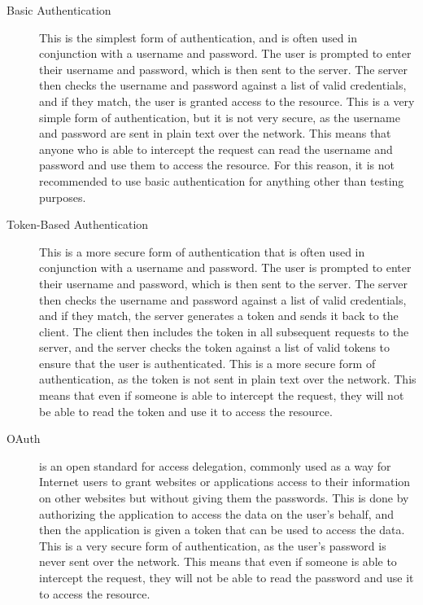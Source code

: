 \documentclass[11pt, a4paper,twoside]{report}
\theoremstyle{plain} %
\theoremstyle{definition} %
\numberwithin{equation}{chapter}
\begin{document}
\begin{description}
    \item[Basic Authentication\cite{basic-authentication}] {
        This is the simplest form of authentication, and is often used in
        conjunction with a username and password. The user is prompted to enter
        their username and password, which is then sent to the server. The
        server then checks the username and password against a list of valid
        credentials, and if they match, the user is granted access to the
        resource. This is a very simple form of authentication, but it is not
        very secure, as the username and password are sent in plain text over
        the network. This means that anyone who is able to intercept the
        request can read the username and password and use them to access the
        resource. For this reason, it is not recommended to use basic
        authentication for anything other than testing purposes.
        }
    \item[Token-Based Authentication\cite{token-based-authentication}] {
        This is a more secure form of authentication that is often used in
        conjunction with a username and password. The user is prompted to enter
        their username and password, which is then sent to the server. The
        server then checks the username and password against a list of valid
        credentials, and if they match, the server generates a token and sends
        it back to the client. The client then includes the token in all
        subsequent requests to the server, and the server checks the token
        against a list of valid tokens to ensure that the user is
        authenticated. This is a more secure form of authentication, as the
        token is not sent in plain text over the network. This means that even
        if someone is able to intercept the request, they will not be able to
        read the token and use it to access the resource.
        }
    \item[OAuth\cite{oauth}] {
        is an open standard for access delegation, commonly used as a way
        for Internet users to grant websites or applications access to their
        information on other websites but without giving them the passwords.
        This is done by authorizing the application to access the data on the
        user's behalf, and then the application is given a token that can be
        used to access the data. This is a very secure form of authentication,
        as the user's password is never sent over the network. This means that
        even if someone is able to intercept the request, they will not be able
        to read the password and use it to access the resource.
        }
\end{description}
\end{document}
